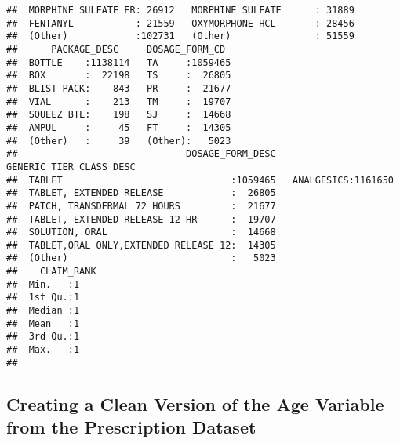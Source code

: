 \documentclass[]{article}
\begin{document}
\begin{verbatim}
##  MORPHINE SULFATE ER: 26912   MORPHINE SULFATE      : 31889  
##  FENTANYL           : 21559   OXYMORPHONE HCL       : 28456  
##  (Other)            :102731   (Other)               : 51559  
##      PACKAGE_DESC     DOSAGE_FORM_CD   
##  BOTTLE    :1138114   TA     :1059465  
##  BOX       :  22198   TS     :  26805  
##  BLIST PACK:    843   PR     :  21677  
##  VIAL      :    213   TM     :  19707  
##  SQUEEZ BTL:    198   SJ     :  14668  
##  AMPUL     :     45   FT     :  14305  
##  (Other)   :     39   (Other):   5023  
##                              DOSAGE_FORM_DESC   GENERIC_TIER_CLASS_DESC
##  TABLET                              :1059465   ANALGESICS:1161650     
##  TABLET, EXTENDED RELEASE            :  26805                          
##  PATCH, TRANSDERMAL 72 HOURS         :  21677                          
##  TABLET, EXTENDED RELEASE 12 HR      :  19707                          
##  SOLUTION, ORAL                      :  14668                          
##  TABLET,ORAL ONLY,EXTENDED RELEASE 12:  14305                          
##  (Other)                             :   5023                          
##    CLAIM_RANK
##  Min.   :1   
##  1st Qu.:1   
##  Median :1   
##  Mean   :1   
##  3rd Qu.:1   
##  Max.   :1   
## 
\end{verbatim}

\subsection{Creating a Clean Version of the Age Variable from the
Prescription
Dataset}\label{creating-a-clean-version-of-the-age-variable-from-the-prescription-dataset}
\end{document}
